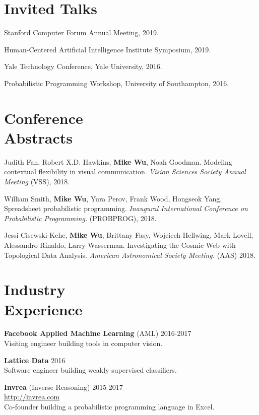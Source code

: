 \documentclass[margin, 10pt]{res} %
\begin{document}
\begin{resume}
\section{Invited Talks}

Stanford Computer Forum Annual Meeting, 2019.

Human-Centered Artificial Intelligence Institute Symposium, 2019.

Yale Technology Conference, Yale University, 2016.

Probabilistic Programming Workshop, University of Southampton, 2016.

\section{Conference \\ Abstracts}

Judith Fan, Robert X.D. Hawkins, \textbf{Mike Wu}, Noah Goodman. Modeling contextual flexibility in visual communication. \textit{Vision Sciences Society Annual Meeting} (VSS), 2018.

William Smith, \textbf{Mike Wu}, Yura Perov, Frank Wood, Hongseok Yang. Spreadsheet probabilistic programming. \textit{Inaugural International Conference on Probabilistic Programming.} (PROBPROG), 2018.

Jessi Cisewski-Kehe, \textbf{Mike Wu}, Brittany Fasy, Wojciech Hellwing, Mark Lovell, Alessandro Rinaldo, Larry Wasserman. Investigating the Cosmic Web with Topological Data Analysis. \textit{American Astronomical Society Meeting.} (AAS) 2018.


\section{Industry \\ Experience}

\textbf{Facebook Applied Machine Learning} (AML) \hfill 2016-2017 \\
Visiting engineer building tools in computer vision.

\textbf{Lattice Data} \hfill 2016 \\
Software engineer building weakly supervised classifiers.

\textbf{Invrea} (Inverse Reasoning) \hfill 2015-2017 \\
\url{http://invrea.com} \\
Co-founder building a probabilistic programming language in Excel.


\end{resume}
\end{document}

